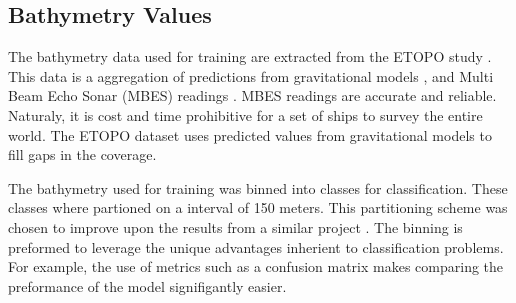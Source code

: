 
\subsection{Bathymetry Values}
The bathymetry data used for training are extracted from the ETOPO study \cite{national1988etopo}.
This data is a aggregation of predictions from gravitational models \cite{smith1997global} \cite{smith1994bathymetric}, and Multi Beam Echo Sonar (MBES) readings \cite{farr1980multibeam}.
MBES readings are accurate and reliable. 
Naturaly, it is cost and time prohibitive for a set of ships to survey the entire world.
The ETOPO dataset uses predicted values from gravitational models to fill gaps in the coverage.

\par
The bathymetry used for training was binned into classes for classification.
These classes where partioned on a interval of 150 meters.
This partitioning scheme was chosen to improve upon the results from a similar project \cite{jena2012prediction}.
The binning is preformed to leverage the unique advantages inherient to classification problems.
For example, the use of metrics such as a confusion matrix makes comparing the preformance of the model signifigantly easier.



